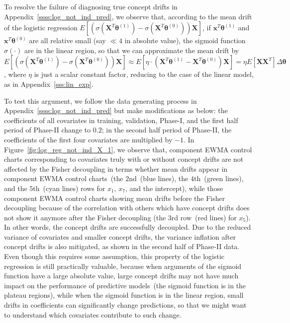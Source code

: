 \documentclass[twoside,11pt]{article}
\begin{document}
\begin{appendices}
To resolve the failure of diagnosing true concept drifts in Appendix~\ref{ssss:log_not_ind_pred}, we observe that, according to the mean drift of the logistic regression $E [ (\sigma (\bm {X}^T\bm { \theta}^{ (1)}) - \sigma ( \bm {X}^T\bm { \theta}^{ (0)})) \bm {X}] $, if $ \bm {x}^T\bm { \theta}^{ (1)}$ and $ \bm {x}^T\bm { \theta}^{ (0)}$ are all relative small (say $\ll 4$ in absolute value), the sigmoid function $ \sigma (\cdot)$ are in the linear region, so that we can approximate the mean drift by $E [ (\sigma ( \bm {X}^T\bm { \theta}^{ (1)} ) - \sigma ( \bm {X}^T\bm { \theta}^{ (0)} )) \bm {X}] \approx E [ \eta\cdot(\bm {X}^T\bm { \theta}^{ (1)} -  \bm {X}^T\bm { \theta}^{ (0)} ) \bm {X}] = \eta E[\bm{XX}^T] \Delta \bm { \theta} $, where $ \eta$ is just a scalar constant factor, reducing to the case of the linear model, as in Appendix~\ref{sss:lin_exp}.  

To test this argument, we follow the data generating process in Appendix~\ref{ssss:log_not_ind_pred} but make modifications as below: the coefficients of all covariates in training, validation, Phase-I, and the first half period of Phase-II change to $0.2$; in the second half period of Phase-II, the coefficients of the first four covariates are multiplied by $-1$. In Figure~\ref{fig:log_reg_not_ind_X_1}, we observe that, component EWMA control charts corresponding to covariates truly with or without concept drifts are not affected by the Fisher decoupling in terms whether mean drifts appear in component EWMA control charts~(the $2$nd~(blue lines), the $4$th~(green lines), and the $5$th~(cyan lines) rows for $x_1$, $x_7$, and the intercept), while those component EWMA control charts showing mean drifts before the Fisher decoupling because of the correlation with others which have concept drifts does not show it anymore after the Fisher decoupling (the $3$rd row~(red lines) for $x_5$). In other words, the concept drifts are successfully decoupled. Due to the reduced variance of covariates and smaller concept drifts, the variance inflation after concept drifts is also mitigated, as shown in the second half of Phase-II data. Even though this requires some assumption, this property of the logistic regression is still practically valuable, because when arguments of the sigmoid function have a large absolute value, large concept drifts may not have much impact on the performance of predictive models~(the sigmoid function is in the plateau regions), while when the sigmoid function is in the linear region, small drifts in coefficients can significantly change predictions, so that we might want to understand which covariates contribute to such change.


\end{appendices}
\end{document}
